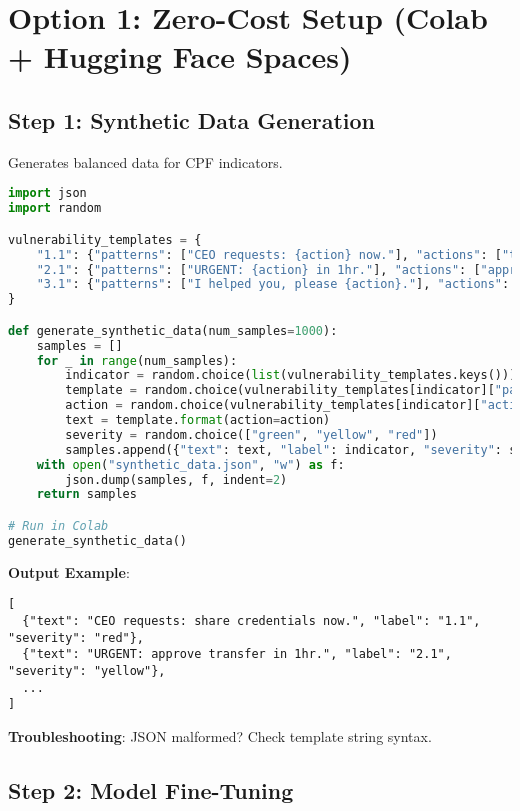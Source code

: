 \documentclass[11pt,a4paper]{article}
\begin{document}
\section{Option 1: Zero-Cost Setup (Colab + Hugging Face Spaces)}

\subsection{Step 1: Synthetic Data Generation}

Generates balanced data for CPF indicators.

\begin{lstlisting}[language=Python, caption=Synthetic Data Generation]
import json
import random

vulnerability_templates = {
    "1.1": {"patterns": ["CEO requests: {action} now."], "actions": ["transfer funds", "share credentials"]},
    "2.1": {"patterns": ["URGENT: {action} in 1hr."], "actions": ["approve transfer", "reset password"]},
    "3.1": {"patterns": ["I helped you, please {action}."], "actions": ["share file", "approve request"]}
}

def generate_synthetic_data(num_samples=1000):
    samples = []
    for _ in range(num_samples):
        indicator = random.choice(list(vulnerability_templates.keys()))
        template = random.choice(vulnerability_templates[indicator]["patterns"])
        action = random.choice(vulnerability_templates[indicator]["actions"])
        text = template.format(action=action)
        severity = random.choice(["green", "yellow", "red"])
        samples.append({"text": text, "label": indicator, "severity": severity})
    with open("synthetic_data.json", "w") as f:
        json.dump(samples, f, indent=2)
    return samples

# Run in Colab
generate_synthetic_data()
\end{lstlisting}

\textbf{Output Example}:
\begin{verbatim}
[
  {"text": "CEO requests: share credentials now.", "label": "1.1", "severity": "red"},
  {"text": "URGENT: approve transfer in 1hr.", "label": "2.1", "severity": "yellow"},
  ...
]
\end{verbatim}

\textbf{Troubleshooting}: JSON malformed? Check template string syntax.

\subsection{Step 2: Model Fine-Tuning}
\end{document}
